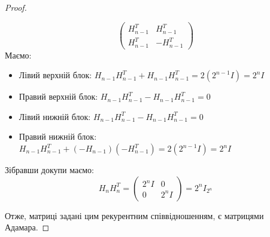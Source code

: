 \begin{proof}
\begin{enumerate}
\begin{equation*}
                \begin{pmatrix} H_{n-1}^T & H_{n-1}^T \\ H_{n-1}^T & -H_{n-1}^T \end{pmatrix}
            \end{equation*}
            Маємо:
            \begin{itemize}
                \item Лівий верхній блок: $H_{n-1}H_{n-1}^T + H_{n-1}H_{n-1}^T = 2(2^{n-1}I) = 2^n I$
                \item Правий верхній блок: $H_{n-1}H_{n-1}^T - H_{n-1}H_{n-1}^T = 0$
                \item Лівий нижній блок: $H_{n-1}H_{n-1}^T - H_{n-1}H_{n-1}^T = 0$
                \item Правий нижній блок: $H_{n-1}H_{n-1}^T + (-H_{n-1})(-H_{n-1}^T) = 2(2^{n-1}I) = 2^n I$
            \end{itemize}
            Зібравши докупи маємо:
            \begin{equation*}
                H_n H_n^T = \begin{pmatrix} 2^n I & 0 \\ 0 & 2^n I \end{pmatrix} = 2^n I_{2^n}
            \end{equation*}
        \end{enumerate}
        Отже, матриці задані цим рекурентним співвідношенням, є матрицями Адамара.
\end{proof}